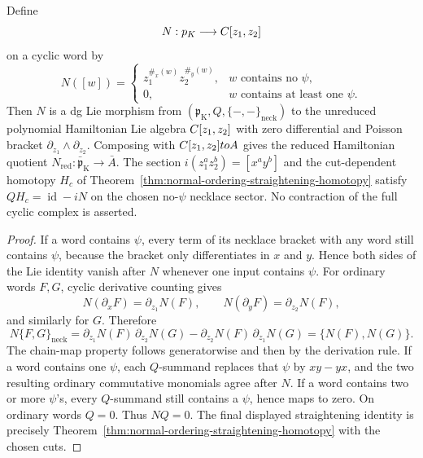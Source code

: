 \documentclass[11pt]{memoir}
\begin{document}
\begin{prop}
\label{prop:normal-ordering-quotient-cyclic-koszul}
  Define
  \[
    N:p_{K}\longrightarrow C[z_1,z_2]
  \]
  on a cyclic word by
  \[
    N([w])=
    \begin{cases}
      z_1^{\#_x(w)}z_2^{\#_y(w)},& w\text{ contains no }\psi,\\
      0,& w\text{ contains at least one }\psi .
    \end{cases}
  \]
  Then \(N\) is a dg Lie morphism from
  \((\mathfrak p_{\mathrm K},Q,\{-,-\}_{\mathrm{neck}})\) to the
  unreduced polynomial Hamiltonian Lie algebra
	  \(C[z_1,z_2]\) with zero differential and Poisson bracket
	  \(\partial_{z_1}\wedge\partial_{z_2}\).  Composing with
	  \(C[z_1,z_2]toA\) gives the reduced Hamiltonian quotient
	  \(N_{\mathrm{red}}:\bar{\mathfrak p}_{\mathrm K}\to\bar A\).  The
	  section \(i(z_1^az_2^b)=[x^ay^b]\) and the cut-dependent homotopy \(H_c\)
	  of Theorem~\ref{thm:normal-ordering-straightening-homotopy}
	  satisfy \(QH_c=\operatorname{id}-iN\) on the chosen no-\(\psi\)
	  necklace sector.  No contraction of the full cyclic complex is asserted.
\end{prop}

\begin{proof}
	  If a word contains \(\psi\), every term of its necklace bracket with any
	  word still contains \(\psi\), because the bracket only
	  differentiates in \(x\) and \(y\).  Hence both sides of the Lie identity
  vanish after \(N\) whenever one input contains \(\psi\).  For ordinary
  words \(F,G\), cyclic derivative counting gives
  \[
    N(\partial_xF)=\partial_{z_1}N(F),\qquad
    N(\partial_yF)=\partial_{z_2}N(F),
  \]
  and similarly for \(G\).  Therefore
  \[
    N\{F,G\}_{\mathrm{neck}}
      =
      \partial_{z_1}N(F)\,\partial_{z_2}N(G)
      -\partial_{z_2}N(F)\,\partial_{z_1}N(G)
      =\{N(F),N(G)\}.
  \]
  The chain-map property follows generatorwise and then by the derivation
  rule.  If a word contains one \(\psi\), each \(Q\)-summand replaces that
  \(\psi\) by \(xy-yx\), and the two resulting ordinary commutative monomials
  agree after \(N\).  If a word contains two or more \(\psi\)'s, every
  \(Q\)-summand still contains a \(\psi\), hence maps to zero.  On ordinary
  words \(Q=0\).  Thus \(NQ=0\).  The final displayed straightening identity is precisely
  Theorem~\ref{thm:normal-ordering-straightening-homotopy} with the chosen
  cuts.
\end{proof}
\end{document}
